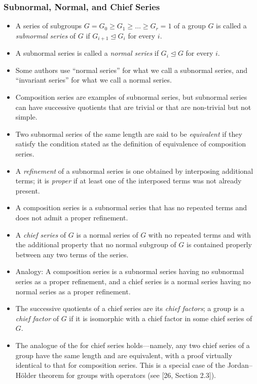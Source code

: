 \documentclass[../Odyssey_Project.tex]{subfiles}
\begin{document}
\subsubsection*{Subnormal, Normal, and Chief Series}
\begin{itemize}
  \item A series of subgroups $G = G_0 \geq G_1 \geq \ldots \geq G_r = 1$ of a group $G$ is called a \emph{subnormal series} of $G$ if $G_{i+1} \trianglelefteq G_i$ for every $i$.
  \item A subnormal series is called a \emph{normal series} if $G_i \trianglelefteq G$ for every $i$.
  \item Some authors use ``normal series'' for what we call a subnormal series, and ``invariant series'' for what we call a normal series.
  \item Composition series are examples of subnormal series, but subnormal series can have successive quotients that are trivial or that are non-trivial but not simple.
  \item Two subnormal series of the same length are said to be \emph{equivalent} if they satisfy the condition stated as the definition of equivalence of composition series.
  \item A \emph{refinement} of a subnormal series is one obtained by interposing additional terms; it is \emph{proper} if at least one of the interposed terms was not already present.
  \item A composition series is a subnormal series that has no repeated terms and does not admit a proper refinement.
  \item A \emph{chief series} of $G$ is a normal series of $G$ with no repeated terms and with the additional property that no normal subgroup of $G$ is contained properly between any two terms of the series.
  \item Analogy: A composition series is a subnormal series having no subnormal series as a proper refinement, and a chief series is a normal series having no normal series as a proper refinement.
  \item The successive quotients of a chief series are its \emph{chief factors}; a group is a \emph{chief factor} of $G$ if it is isomorphic with a chief factor in some chief series of $G$.
  \item The analogue of the  for chief series holds---namely, any two chief series of a group have the same length and are equivalent, with a proof virtually identical to that for composition series. This is a special case of the Jordan--H\"older theorem for groups with operators (see [26, Section 2.3]).
\end{itemize}
\end{document}
